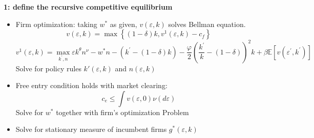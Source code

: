 \documentclass[12pt]{article}
\begin{document}
\textbf{1: define the recursive competitive equilibrium}
  \begin{itemize}
    \item Firm optimization: taking $w^*$ as given, $v(\varepsilon, k)$ solves Bellman equation.
    $$v(\varepsilon, k)=\max \left\{(1-\delta) k, v^{1}(\varepsilon, k)-c_{f}\right\}$$
    $$v^{1}(\varepsilon, k)=\max _{k^{\prime}, n} \varepsilon k^{\theta} n^{\nu}-w^{*} n-\left(k^{\prime}-(1-\delta) k\right)-\frac{\varphi}{2}\left(\frac{k^{\prime}}{k}-(1-\delta)\right)^{2} k+\beta \mathbb{E}\left[v\left(\varepsilon^{\prime}, k^{\prime}\right)\right]$$
    Solve for policy rules $k'(\varepsilon, k)$ and $n(\varepsilon, k)$
    \item Free entry condition holds with market clearing:
    $$c_{e} \leq \int v(\varepsilon, 0) \nu(d \varepsilon)$$
    Solve for $w^*$ together with firm's optimization Problem
    \item Solve for stationary measure of incumbent firms $g^*(\varepsilon, k)$
  \end{itemize}
\end{document}
